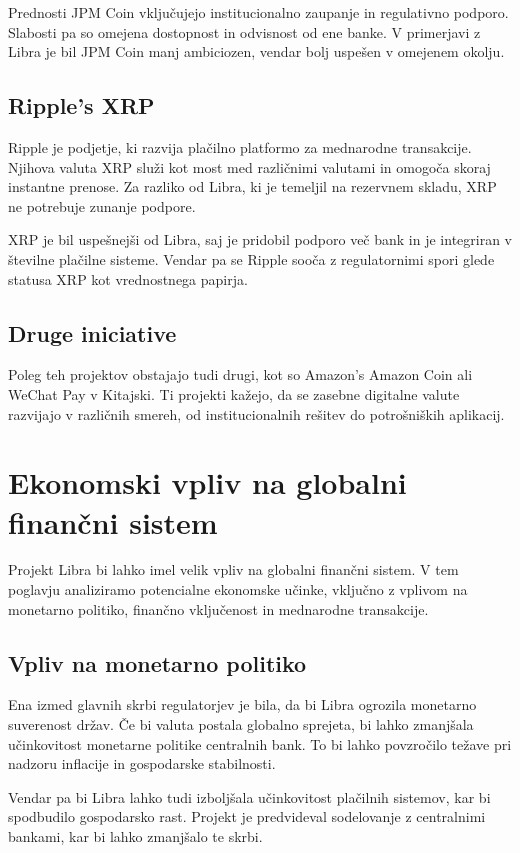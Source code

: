 \documentclass[12pt,a4paper]{article}
\begin{document}
Prednosti JPM Coin vključujejo institucionalno zaupanje in regulativno podporo. Slabosti pa so omejena dostopnost in odvisnost od ene banke. V primerjavi z Libra je bil JPM Coin manj ambiciozen, vendar bolj uspešen v omejenem okolju.

\subsection{Ripple's XRP}
Ripple je podjetje, ki razvija plačilno platformo za mednarodne transakcije. Njihova valuta XRP služi kot most med različnimi valutami in omogoča skoraj instantne prenose. Za razliko od Libra, ki je temeljil na rezervnem skladu, XRP ne potrebuje zunanje podpore.

XRP je bil uspešnejši od Libra, saj je pridobil podporo več bank in je integriran v številne plačilne sisteme. Vendar pa se Ripple sooča z regulatornimi spori glede statusa XRP kot vrednostnega papirja.

\subsection{Druge iniciative}
Poleg teh projektov obstajajo tudi drugi, kot so Amazon's Amazon Coin ali WeChat Pay v Kitajski. Ti projekti kažejo, da se zasebne digitalne valute razvijajo v različnih smereh, od institucionalnih rešitev do potrošniških aplikacij.

\section{Ekonomski vpliv na globalni finančni sistem}

Projekt Libra bi lahko imel velik vpliv na globalni finančni sistem. V tem poglavju analiziramo potencialne ekonomske učinke, vključno z vplivom na monetarno politiko, finančno vključenost in mednarodne transakcije.

\subsection{Vpliv na monetarno politiko}
Ena izmed glavnih skrbi regulatorjev je bila, da bi Libra ogrozila monetarno suverenost držav. Če bi valuta postala globalno sprejeta, bi lahko zmanjšala učinkovitost monetarne politike centralnih bank. To bi lahko povzročilo težave pri nadzoru inflacije in gospodarske stabilnosti.

Vendar pa bi Libra lahko tudi izboljšala učinkovitost plačilnih sistemov, kar bi spodbudilo gospodarsko rast. Projekt je predvideval sodelovanje z centralnimi bankami, kar bi lahko zmanjšalo te skrbi.
\end{document}
